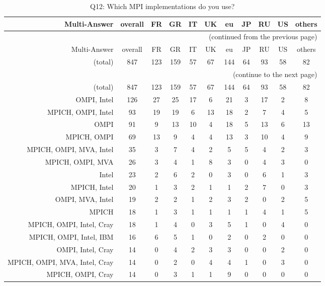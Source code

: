 \clearpage%
{\footnotesize\begin{landscape}%
\begin{longtable}[htb]{r|c|c|c|c|c|c|c|c|c|c}%
\caption{Q12: Which MPI implementations do you use?}%
\label{tab:Q12-mans} \\%
\hline%
Multi-Answer & overall & FR & GR & IT & UK & eu & JP & RU & US & others \\
 \hline%
\endfirsthead%
\multicolumn{11}{r}{(continued from the previous page)}\\%
\hline%
Multi-Answer & overall & FR & GR & IT & UK & eu & JP & RU & US & others \\
 \hline%
\endhead%
\hline%
(total) & 847 & 123 & 159 & 57 & 67 & 144 & 64 & 93 & 58 & 82 \\%
\hline%
\multicolumn{11}{r}{(continue to the next page)}\\%
\endfoot%
\hline%
(total) & 847 & 123 & 159 & 57 & 67 & 144 & 64 & 93 & 58 & 82 \\%
\hline%
\endlastfoot%
\hline%
{OMPI, Intel} & 126 & 27 & 25 & 17 & 6 & 21 & 3 & 17 & 2 & 8 \\%
{MPICH, OMPI, Intel} & 93 & 19 & 19 & 6 & 13 & 18 & 2 & 7 & 4 & 5 \\%
{OMPI} & 91 & 9 & 13 & 10 & 4 & 18 & 5 & 13 & 6 & 13 \\%
{MPICH, OMPI} & 69 & 13 & 9 & 4 & 4 & 13 & 3 & 10 & 4 & 9 \\%
{MPICH, OMPI, MVA, Intel} & 35 & 3 & 7 & 4 & 2 & 5 & 5 & 4 & 2 & 3 \\%
{MPICH, OMPI, MVA} & 26 & 3 & 4 & 1 & 8 & 3 & 0 & 4 & 3 & 0 \\%
{Intel} & 23 & 2 & 6 & 2 & 0 & 3 & 0 & 6 & 1 & 3 \\%
{MPICH, Intel} & 20 & 1 & 3 & 2 & 1 & 1 & 2 & 7 & 0 & 3 \\%
{OMPI, MVA, Intel} & 19 & 2 & 2 & 1 & 2 & 3 & 2 & 0 & 2 & 5 \\%
{MPICH} & 18 & 1 & 3 & 1 & 1 & 1 & 1 & 4 & 1 & 5 \\%
{MPICH, OMPI, Intel, Cray} & 18 & 1 & 4 & 0 & 3 & 5 & 1 & 0 & 4 & 0 \\%
{MPICH, OMPI, Intel, IBM} & 16 & 6 & 5 & 1 & 0 & 2 & 0 & 2 & 0 & 0 \\%
{OMPI, Intel, Cray} & 14 & 0 & 4 & 2 & 3 & 3 & 0 & 0 & 2 & 0 \\%
{MPICH, OMPI, MVA, Intel, Cray} & 14 & 0 & 2 & 0 & 4 & 4 & 1 & 0 & 3 & 0 \\%
{MPICH, OMPI, Cray} & 14 & 0 & 3 & 1 & 1 & 9 & 0 & 0 & 0 & 0 \\%

\end{longtable}
\end{landscape}}
